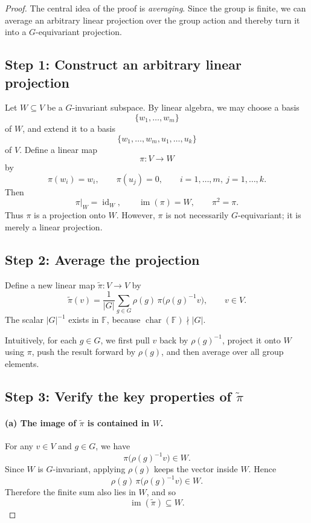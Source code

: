 \documentclass[12pt,a4paper]{article}
\theoremstyle{remark}
\begin{document}
\begin{proof}
The central idea of the proof is \emph{averaging}. Since the group is finite,
we can average an arbitrary linear projection over the group action and thereby
turn it into a \(G\)-equivariant projection.

\subsection*{Step 1: Construct an arbitrary linear projection}

Let \(W \subseteq V\) be a \(G\)-invariant subspace. By linear algebra, we may
choose a basis
\[
  \{w_1,\dots,w_m\}
\]
of \(W\), and extend it to a basis
\[
  \{w_1,\dots,w_m,u_1,\dots,u_k\}
\]
of \(V\). Define a linear map
\[
  \pi: V \longrightarrow W
\]
by
\[
  \pi(w_i)=w_i,\qquad \pi(u_j)=0,
  \qquad i=1,\dots,m,\ j=1,\dots,k.
\]
Then
\[
  \pi|_W=\operatorname{id}_W,\qquad
  \operatorname{im}(\pi)=W,\qquad
  \pi^2=\pi.
\]
Thus \(\pi\) is a projection onto \(W\). However, \(\pi\) is not necessarily
\(G\)-equivariant; it is merely a linear projection.

\subsection*{Step 2: Average the projection}

Define a new linear map \(\widetilde{\pi}:V\to V\) by
\[
  \widetilde{\pi}(v)
  =
  \frac{1}{|G|}
  \sum_{g\in G}
  \rho(g)\,\pi\bigl(\rho(g)^{-1}v\bigr),
  \qquad v\in V.
\]
The scalar \(|G|^{-1}\) exists in \(\mathbb{F}\), because
\(\operatorname{char}(\mathbb{F})\nmid |G|\).

Intuitively, for each \(g\in G\), we first pull \(v\) back by
\(\rho(g)^{-1}\), project it onto \(W\) using \(\pi\), push the result forward
by \(\rho(g)\), and then average over all group elements.

\subsection*{Step 3: Verify the key properties of \(\widetilde{\pi}\)}

\paragraph{(a) The image of \(\widetilde{\pi}\) is contained in \(W\).}
For any \(v\in V\) and \(g\in G\), we have
\[
  \pi\bigl(\rho(g)^{-1}v\bigr)\in W.
\]
Since \(W\) is \(G\)-invariant, applying \(\rho(g)\) keeps the vector inside
\(W\). Hence
\[
  \rho(g)\,\pi\bigl(\rho(g)^{-1}v\bigr)\in W.
\]
Therefore the finite sum also lies in \(W\), and so
\[
  \operatorname{im}(\widetilde{\pi})\subseteq W.
\]


\end{proof}
\end{document}
